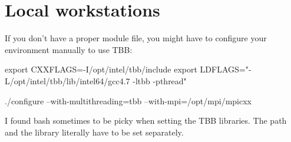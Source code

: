 \section{Local workstations}
If you don't have a proper module file, you might have to configure your environment manually to use TBB:
\begin{code}
export CXXFLAGS=-I/opt/intel/tbb/include
export LDFLAGS="-L/opt/intel/tbb/lib/intel64/gcc4.7 -ltbb -pthread"

./configure --with-multithreading=tbb --with-mpi=/opt/mpi/mpicxx
\end{code}

I found bash sometimes to be picky when setting the TBB libraries. The path and the library literally have to be set separately.






